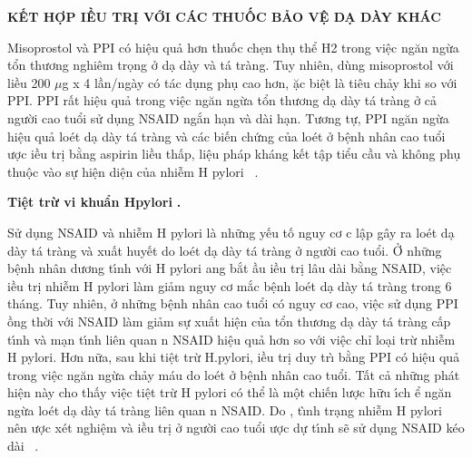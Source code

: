 \documentclass[9pt,twocolumn]{article}
\begin{document}
\textbf{KẾT HỢP \text{\DJ}IỀU TR\d{I} VỚI C\'{A}C THUỐC BẢO VỆ D\d{A} D\`{A}Y KH\'{A}C}

Misoprostol v\`{a} PPI c{\'{o}} hi{\^{\d{e}}}u quả hơn thuốc ch\d{e}n th\d{u} thể H2 trong vi{\^{\d{e}}}c ng{\u{a}}n ngừa tổn thương nghi{\^{e}}m tr\d{o}ng ở d{\d{a}} d\`{a}y v\`{a} t\'{a} tr\`{a}ng. Tuy nhi{\^{e}}n, d\`{u}ng misoprostol với liều 200 \ensuremath{\mu}g x 4 lần/ng\`{a}y c{\'{o}} t\'{a}c d\d{u}ng ph\d{u} cao hơn, \text{\dj}ặc bi{\^{\d{e}}}t l\`{a} ti{\^{e}}u chảy khi so với PPI. PPI rất hi{\^{\d{e}}}u quả trong vi{\^{\d{e}}}c ng{\u{a}}n ngừa tổn thương d{\d{a}} d\`{a}y t\'{a} tr\`{a}ng ở cả người cao tuổi sử d\d{u}ng NSAID ngắn h{\d{a}}n v\`{a} d\`{a}i h{\d{a}}n. Tương tự, PPI ng{\u{a}}n ngừa hi{\^{\d{e}}}u quả lo{\'e}t d{\d{a}} d\`{a}y t\'{a} tr\`{a}ng v\`{a} c\'{a}c bi{{\'{\^{e}}}}n chứng của lo{\'e}t ở b{\^{\d{e}}}nh nh\^{a}n cao tuổi \text{\dj}ược \text{\dj}iều tr\d{i} bằng aspirin liều thấp, li{\^{\d{e}}}u ph\'{a}p kh\'{a}ng k{{\'{\^{e}}}}t t{\^{\d{a}}}p tiểu cầu v\`{a} kh{\^o}ng ph\d{u} thu{\^{\d{o}}}c v\`{a}o sự hi{\^{\d{e}}}n di{\^{\d{e}}}n của nhi{\~{\^e}}m H pylori\unskip~\cite{2901310:34531806,2901310:34531812} .

\textbf{Ti{\^{\d{e}}}t trừ vi khuẩn H}\textbf{\space }\textbf{pylori} \textbf{. }

Sử d\d{u}ng NSAID v\`{a} nhi{\~{\^e}}m H pylori l\`{a} những y{{\'{\^{e}}}}u tố nguy cơ c l{\^{\d{a}}}p g\^{a}y ra lo{\'e}t d{\d{a}} d\`{a}y t\'{a} tr\`{a}ng v\`{a} xuất huy{{\'{\^{e}}}}t do lo{\'e}t d{\d{a}} d\`{a}y t\'{a} tr\`{a}ng ở người cao tuổi. Ở những b{\^{\d{e}}}nh nh\^{a}n dương t\'{\i}nh với H pylori \text{\dj}ang bắt \text{\dj}ầu \text{\dj}iều tr\d{i} l\^{a}u d\`{a}i bằng NSAID, vi{\^{\d{e}}}c \text{\dj}iều tr\d{i} nhi{\~{\^e}}m H pylori l\`{a}m giảm nguy cơ mắc b{\^{\d{e}}}nh lo{\'e}t d{\d{a}} d\`{a}y t\'{a} tr\`{a}ng trong 6 th\'{a}ng. Tuy nhi{\^{e}}n, ở những b{\^{\d{e}}}nh nh\^{a}n cao tuổi c{\'{o}} nguy cơ cao, vi{\^{\d{e}}}c sử d\d{u}ng PPI \text{\dj}ồng thời với NSAID l\`{a}m giảm sự xuất hi{\^{\d{e}}}n của tổn thương d{\d{a}} d\`{a}y t\'{a} tr\`{a}ng cấp t\'{\i}nh v\`{a} m{\d{a}}n t\'{\i}nh li{\^{e}}n quan n NSAID hi{\^{\d{e}}}u quả hơn so với vi{\^{\d{e}}}c chỉ lo{\d{a}}i trừ nhi{\~{\^e}}m H pylori. Hơn nữa, sau khi ti{\^{\d{e}}}t trừ H.pylori, \text{\dj}iều tr\d{i} duy tr\`{\i} bằng PPI c{\'{o}} hi{\^{\d{e}}}u quả trong vi{\^{\d{e}}}c ng{\u{a}}n ngừa chảy m\'{a}u do lo{\'e}t ở b{\^{\d{e}}}nh nh\^{a}n cao tuổi. Tất cả những ph\'{a}t hi{\^{\d{e}}}n n\`{a}y cho thấy vi{\^{\d{e}}}c ti{\^{\d{e}}}t trừ H pylori c{\'{o}} thể l\`{a} m{\^{\d{o}}}t chi{{\'{\^{e}}}}n lược hữu \'{\i}ch \text{\dj}ể ng{\u{a}}n ngừa lo{\'e}t d{\d{a}} d\`{a}y t\'{a} tr\`{a}ng li{\^{e}}n quan n NSAID. Do , t\`{\i}nh tr{\d{a}}ng nhi{\~{\^e}}m H pylori n{\^{e}}n \text{\dj}ược x{\'e}t nghi{\^{\d{e}}}m v\`{a} \text{\dj}iều tr\d{i} ở người cao tuổi \text{\dj}ược dự t\'{\i}nh sẽ sử d\d{u}ng NSAID k{\'e}o d\`{a}i\unskip~\cite{2901310:34531806,2901310:34531814} .
\end{document}
